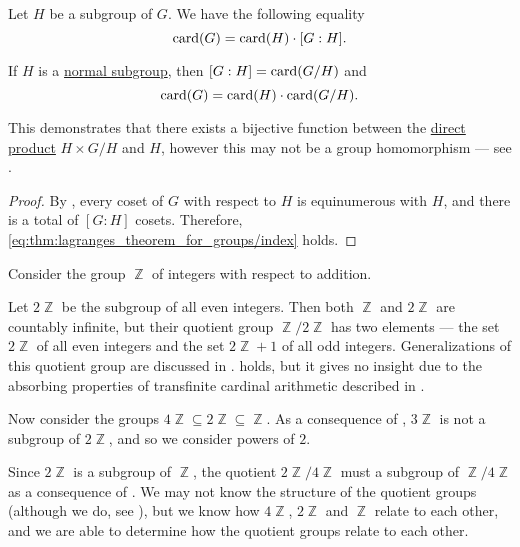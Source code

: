 \begin{theorem}\label{thm:lagranges_theorem_for_groups}
  Let \( H \) be a subgroup of \( G \). We have the following equality
  \begin{equation}\label{eq:thm:lagranges_theorem_for_groups/index}
    \operatorname{card}(G) = \operatorname{card}(H) \cdot [G : H].
  \end{equation}

  If \( H \) is a \hyperref[thm:normal_subgroup_equivalences]{normal subgroup}, then \( [G : H] = \operatorname{card}(G / H) \) and
  \begin{equation}\label{eq:thm:lagranges_theorem_for_groups/card}
    \operatorname{card}(G) = \operatorname{card}(H) \cdot \operatorname{card}(G / H).
  \end{equation}

  This demonstrates that there exists a bijective function between the \hyperref[def:monoid_direct_product]{direct product} \( H \times G / H \) and \( H \), however this may not be a group homomorphism --- see .
\end{theorem}
\begin{proof}
  By , every coset of \( G \) with respect to \( H \) is equinumerous with \( H \), and there is a total of \( [G : H] \) cosets. Therefore, \eqref{eq:thm:lagranges_theorem_for_groups/index} holds.
\end{proof}

\begin{example}\label{ex:subgroups_of_integers}
  Consider the group \( \BbbZ \) of integers with respect to addition.

  Let \( 2\BbbZ \) be the subgroup of all even integers. Then both \( \BbbZ \) and \( 2\BbbZ \) are countably infinite, but their quotient group \( \BbbZ / 2\BbbZ \) has two elements --- the set \( 2\BbbZ \) of all even integers and the set \( 2\BbbZ + 1 \) of all odd integers. Generalizations of this quotient group are discussed in .  holds, but it gives no insight due to the absorbing properties of transfinite cardinal arithmetic described in .

  Now consider the groups \( 4\BbbZ \subseteq 2\BbbZ \subseteq \BbbZ \). As a consequence of , \( 3\BbbZ \) is not a subgroup of \( 2\BbbZ \), and so we consider powers of \( 2 \).

  Since \( 2\BbbZ \) is a subgroup of \( \BbbZ \), the quotient \( 2\BbbZ / 4\BbbZ \) must a subgroup of \( \BbbZ / 4\BbbZ \) as a consequence of . We may not know the structure of the quotient groups (although we do, see ), but we know how \( 4\BbbZ \), \( 2\BbbZ \) and \( \BbbZ \) relate to each other, and we are able to determine how the quotient groups relate to each other.
\end{example}
